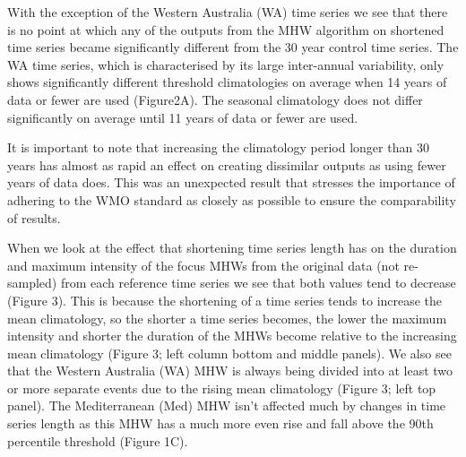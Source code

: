 \documentclass[]{article}
\begin{document}
{With the exception of the Western Australia (WA) time series we see that
there is no point at which any of the outputs from the MHW algorithm on
shortened time series became significantly different from the 30 year
control time series. The WA time series, which is characterised by its
large inter-annual variability, only shows significantly different
threshold climatologies on average when 14 years of data or fewer are
used (Figure2A). The seasonal climatology does not differ significantly
on average until 11 years of data or fewer are used.

It is important to note that increasing the climatology period longer
than 30 years has almost as rapid an effect on creating dissimilar
outputs as using fewer years of data does. This was an unexpected result
that stresses the importance of adhering to the WMO standard as closely
as possible to ensure the comparability of results.

When we look at the effect that shortening time series length has on the
duration and maximum intensity of the focus MHWs from the original data
(not re-sampled) from each reference time series we see that both values
tend to decrease (Figure 3). This is because the shortening of a time
series tends to increase the mean climatology, so the shorter a time
series becomes, the lower the maximum intensity and shorter the duration
of the MHWs become relative to the increasing mean climatology (Figure
3; left column bottom and middle panels). We also see that the Western
Australia (WA) MHW is always being divided into at least two or more
separate events due to the rising mean climatology (Figure 3; left top
panel). The Mediterranean (Med) MHW isn't affected much by changes in
time series length as this MHW has a much more even rise and fall above
the 90th percentile threshold (Figure 1C).

}
\end{document}
